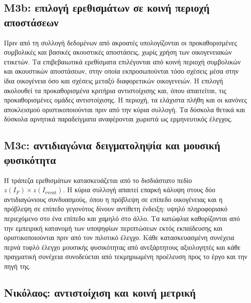 \documentclass[11pt,a4paper]{article}
\begin{document}
\subsection{M3b: επιλογή ερεθισμάτων σε κοινή περιοχή αποστάσεων}\label{app:match-m3b}

Πριν από τη συλλογή δεδομένων από ακροατές υπολογίζονται οι προκαθορισμένες συμβολικές και βασικές ακουστικές αποστάσεις, χωρίς χρήση των οικογενειακών ετικετών. Τα επιβεβαιωτικά ερεθίσματα επιλέγονται από κοινή περιοχή συμβολικών και ακουστικών αποστάσεων, στην οποία εκπροσωπούνται τόσο σχέσεις μέσα στην ίδια οικογένεια όσο και σχέσεις μεταξύ διαφορετικών οικογενειών. Η επιλογή ακολουθεί τα προκαθορισμένα κριτήρια αντιστοίχισης και, όπου απαιτείται, τις προκαθορισμένες ομάδες αντιστοίχισης. Η περιοχή, τα ελάχιστα πλήθη και οι κανόνες αποκλεισμού οριστικοποιούνται πριν από την κύρια συλλογή. Τα δύσκολα θετικά και δύσκολα αρνητικά παραδείγματα αναφέρονται χωριστά ως ερμηνευτικός έλεγχος.

\subsection{M3c: αντιδιαγώνια δειγματοληψία και μουσική φυσικότητα}\label{app:match-m3c}

Η τράπεζα ερεθισμάτων κατασκευάζεται από το δισδιάστατο πεδίο $z(I_F)\times z(I_{\mathrm{event}})$. Η κύρια συλλογή απαιτεί επαρκή κάλυψη στους δύο αντιδιαγώνιους συνδυασμούς, όπου η πρόβλεψη σε επίπεδο οικογένειας και η πρόβλεψη σε επίπεδο γεγονότος δίνουν αντίθετη ένδειξη: υψηλό πληροφοριακό περιεχόμενο στο ένα επίπεδο και χαμηλό στο άλλο. Τα κατώφλια καθορίζονται από την εμπειρική κατανομή των υποψηφίων περιπτώσεων εκτός εκπαίδευσης και οριστικοποιούνται πριν από τον πιλοτικό έλεγχο. Κάθε κατασκευασμένη συνέχεια περνά τυφλό έλεγχο μουσικής φυσικότητας από ανεξάρτητους αξιολογητές και κάθε πραγματική συνέχεια συνοδεύεται από τεκμηριωμένη προέλευση προς το έργο και την πηγή της.

\subsection{Νικόλαος: αντιστοίχιση και κοινή μετρική}\label{app:match-nikolaos}
\end{document}
